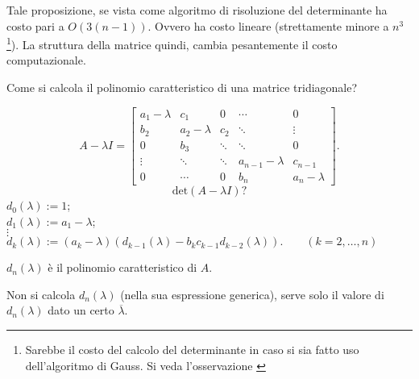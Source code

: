 \begin{osse}
Tale proposizione, se vista come algoritmo di risoluzione del determinante
ha costo pari a $O(3(n-1))$. Ovvero ha costo lineare (strettamente minore
a $n^3$\footnote{Sarebbe il costo del calcolo del determinante in caso si sia
fatto uso dell'algoritmo di Gauss. Si veda l'osservazione \cite{gauss-determinante}}).
La struttura della matrice quindi, cambia pesantemente il costo computazionale.
\end{osse}

Come si calcola il polinomio caratteristico di una matrice tridiagonale?

\[ A - \lambda I =
\left[ \begin{array}{ccccc}
a_1- \lambda    & c_1    & 0      & \cdots & 0 \\
b_2    & a_2 - \lambda   & c_2    & \ddots & \vdots \\
0      & b_3    & \ddots & \ddots & 0 \\
\vdots & \ddots & \ddots & a_{n-1}- \lambda& c_{n-1} \\
0      & \cdots & 0      & b_{n} & a_n - \lambda
\end{array} \right].
\]
\[
\textrm{det}(A-\lambda I)?\]
$d_0(\lambda) :=  1$;   \\
$d_1(\lambda) :=  a_1 - \lambda$; \\
$\vdots$      \\
$d_k(\lambda) :=  (a_k- \lambda) (d_{k-1}(\lambda) - b_kc_{k-1}d_{k-2}(\lambda)).
 \qquad (k = 2, \ldots, n)$\\

\begin{flushleft}
$d_n(\lambda)$ è il polinomio caratteristico di $A$.
\end{flushleft}

\begin{osse}
Non si calcola $d_n(\lambda)$ (nella sua espressione generica), serve solo
il valore di $d_n(\lambda)$ dato un certo $\overline{\lambda}$.
\end{osse}

